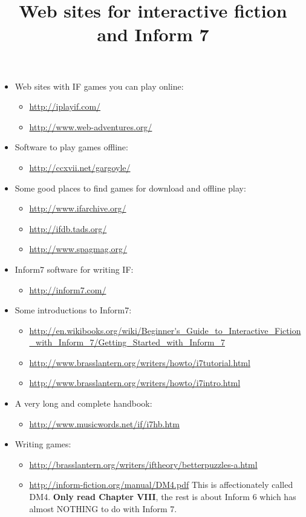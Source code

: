 \documentclass{article}
\title{Web sites for interactive fiction and Inform 7}
\newcommand{\bi}{\begin{itemize}}
\newcommand{\ei}{\end{itemize}}
\newcommand{\ii}{\item}
\begin{document}
\maketitle

\bi

\ii Web sites with IF games you can play online:
\bi
\ii
\url{http://iplayif.com/}
\ii
\url{http://www.web-adventures.org/}
\ei

\ii
Software to play games offline:
\bi
\ii
\url{http://ccxvii.net/gargoyle/}
\ei

\ii
Some good places to find games for download and offline play:
\bi
\ii
\url{http://www.ifarchive.org/}

\ii
\url{http://ifdb.tads.org/}

\ii
\url{http://www.spagmag.org/}
\ei

\ii Inform7 software for writing IF:
\bi
\ii
\url{http://inform7.com/}
\ei
\ii Some introductions to Inform7:
\bi
\ii
\url{http://en.wikibooks.org/wiki/Beginner's_Guide_to_Interactive_Fiction_with_Inform_7/Getting_Started_with_Inform_7}

\ii
\url{http://www.brasslantern.org/writers/howto/i7tutorial.html}

\ii
\url{http://www.brasslantern.org/writers/howto/i7intro.html}
\ei

\ii A very long and complete handbook:
\bi
\ii
\url{http://www.musicwords.net/if/i7hb.htm}
\ei

\ii Writing games:
\bi
\ii
\url{http://brasslantern.org/writers/iftheory/betterpuzzles-a.html}


\ii
\url{http://inform-fiction.org/manual/DM4.pdf}
 This is affectionately called DM4.  {\bf Only read Chapter VIII}, the
rest is about Inform 6 which has almost NOTHING to do with Inform 7.
\ei
\ei
\end{document}
